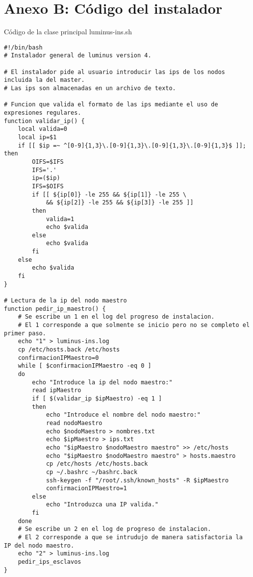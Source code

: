 \section{Anexo B: Código del instalador}
Código de la clase principal luminus-ins.sh
\begin{lstlisting} 
#!/bin/bash
# Instalador general de luminus version 4.

# El instalador pide al usuario introducir las ips de los nodos incluida la del master.
# Las ips son almacenadas en un archivo de texto.

# Funcion que valida el formato de las ips mediante el uso de expresiones regulares.
function validar_ip() {
	local valida=0
	local ip=$1
	if [[ $ip =~ ^[0-9]{1,3}\.[0-9]{1,3}\.[0-9]{1,3}\.[0-9]{1,3}$ ]]; then
	    OIFS=$IFS
	    IFS='.'
	    ip=($ip)
	    IFS=$OIFS
	    if [[ ${ip[0]} -le 255 && ${ip[1]} -le 255 \
	        && ${ip[2]} -le 255 && ${ip[3]} -le 255 ]]
	    then
	    	valida=1
	    	echo $valida
	    else
	    	echo $valida
	    fi
	else
		echo $valida
	fi
}

# Lectura de la ip del nodo maestro
function pedir_ip_maestro() {
	# Se escribe un 1 en el log del progreso de instalacion.
	# El 1 corresponde a que solmente se inicio pero no se completo el primer paso.
	echo "1" > luminus-ins.log
	cp /etc/hosts.back /etc/hosts
	confirmacionIPMaestro=0
	while [ $confirmacionIPMaestro -eq 0 ]
	do
		echo "Introduce la ip del nodo maestro:"
		read ipMaestro
		if [ $(validar_ip $ipMaestro) -eq 1 ]
		then
			echo "Introduce el nombre del nodo maestro:"
			read nodoMaestro
			echo $nodoMaestro > nombres.txt
			echo $ipMaestro > ips.txt
			echo "$ipMaestro $nodoMaestro maestro" >> /etc/hosts
			echo "$ipMaestro $nodoMaestro maestro" > hosts.maestro
			cp /etc/hosts /etc/hosts.back
			cp ~/.bashrc ~/bashrc.back
			ssh-keygen -f "/root/.ssh/known_hosts" -R $ipMaestro
			confirmacionIPMaestro=1
		else	
			echo "Introduzca una IP valida."
		fi
	done
	# Se escribe un 2 en el log de progreso de instalacion.
	# El 2 corresponde a que se intrudujo de manera satisfactoria la IP del nodo maestro.
	echo "2" > luminus-ins.log
	pedir_ips_esclavos
}


\end{lstlisting}
